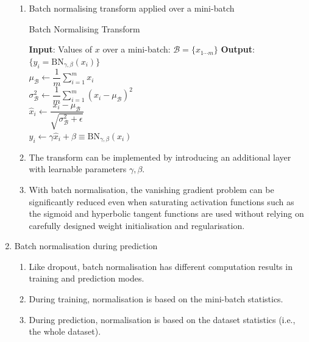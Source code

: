 \documentclass[11pt]{article}
\begin{document}
\begin{enumerate}
\begin{enumerate}
        \item Batch normalising transform applied over a mini-batch
        \begin{algorithm}
            \caption{Batch Normalising Transform}
            \begin{algorithmic}[1]
                \State \textbf{Input}: Values of $x$ over a mini-batch: $\mathcal{B} = \{x_{1 \cdots m}\}$
                \State \textbf{Output}: $\{y_i = \text{BN}_{\gamma, \beta}(x_i)\}$\\
                $\mu_{\mathcal{B}} \gets \dfrac{1}{m} \sum_{i=1}^{m} x_i$ \\
                $\sigma_{\mathcal{B}}^2 \gets \dfrac{1}{m} \sum_{i=1}^{m} (x_i - \mu_{\mathcal{B}})^2$ \\
                $\hat{x}_i \gets \dfrac{x_i - \mu_{\mathcal{B}}}{\sqrt{\sigma_{\mathcal{B}}^2 + \epsilon}}$ \\
                $y_i \gets \gamma \hat{x}_i + \beta \equiv \text{BN}_{\gamma, \beta}(x_i)$ 
            \end{algorithmic}
        \end{algorithm}
        \item The transform can be implemented by introducing an additional layer with learnable parameters $\gamma, \beta$.
        \item With batch normalisation, the vanishing gradient problem can be significantly reduced even when saturating activation functions such as the sigmoid and hyperbolic tangent functions are used without relying on carefully designed weight initialisation and regularisation.
    \end{enumerate}
    \item Batch normalisation during prediction
    \begin{enumerate}
        \item Like dropout, batch normalisation has different computation results in training and prediction modes.
        \item During training, normalisation is based on the mini-batch statistics.
        \item During prediction, normalisation is based on the dataset statistics (i.e., the whole dataset).
    \end{enumerate}
\end{enumerate}
\end{document}
